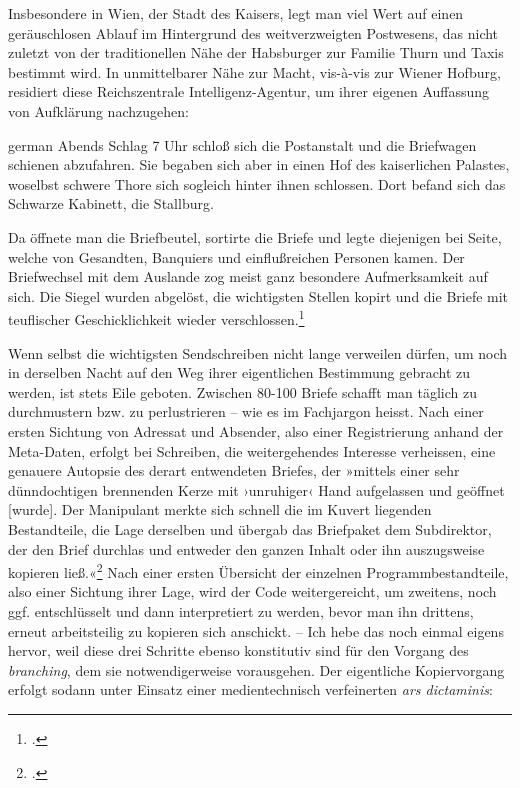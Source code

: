 \documentclass[a4paper,11pt]{article}
\newcommand{\anf}[1]{»#1«}
\newenvironment{zitat}{
\begin{foreigndisplayquote}{german}}%
{\end{foreigndisplayquote}}
\begin{document}
Insbesondere in Wien, der Stadt des Kaisers, legt man viel Wert auf einen geräuschlosen Ablauf im Hintergrund des weitverzweigten Postwesens, das nicht zuletzt von der traditionellen Nähe der Habsburger zur Familie Thurn und Taxis bestimmt wird. In unmittelbarer Nähe zur Macht, vis-à-vis zur Wiener Hofburg, residiert diese Reichszentrale Intelligenz-Agentur, um ihrer eigenen Auffassung von Aufklärung nachzugehen:
\begin{zitat}
Abends Schlag 7 Uhr schloß sich die Postanstalt und die Briefwagen schienen abzufahren. Sie begaben sich aber in einen Hof des kaiserlichen Palastes, woselbst schwere Thore sich sogleich hinter ihnen schlossen. Dort befand sich das Schwarze Kabinett, die Stallburg.

Da öffnete man die Briefbeutel, sortirte die Briefe und legte diejenigen bei Seite, welche von Gesandten, Banquiers und einflußreichen Personen kamen. Der Briefwechsel mit dem Auslande zog meist ganz besondere Aufmerksamkeit auf sich. Die Siegel wurden abgelöst, die wichtigsten Stellen kopirt und die Briefe mit teuflischer Geschicklichkeit wieder verschlossen.\footcite[40]{koenig:1875}
\end{zitat}
Wenn selbst die wichtigsten Sendschreiben nicht lange verweilen dürfen, um noch in derselben Nacht auf den Weg ihrer eigentlichen Bestimmung gebracht zu werden, ist stets Eile geboten. Zwischen 80-100 Briefe schafft man täglich zu durchmustern bzw. zu perlustrieren – wie es im Fachjargon heisst. Nach einer ersten Sichtung von Adressat und Absender, also einer Registrierung anhand der Meta-Daten, erfolgt bei Schreiben, die weitergehendes Interesse verheissen, eine genauere Autopsie des derart entwendeten Briefes, der \anf{mittels einer sehr dünndochtigen brennenden Kerze mit ›unruhiger‹ Hand aufgelassen und geöffnet [wurde]. Der Manipulant merkte sich schnell die im Kuvert liegenden Bestandteile, die Lage derselben und übergab das Briefpaket dem Subdirektor, der den Brief durchlas und entweder den ganzen Inhalt oder ihn auszugsweise kopieren ließ.}\footcite[138]{stix:1937} Nach einer ersten Übersicht der einzelnen Programmbestandteile, also einer Sichtung ihrer Lage, wird der Code weitergereicht, um zweitens, noch ggf. entschlüsselt und dann interpretiert zu werden, bevor man ihn drittens, erneut arbeitsteilig zu kopieren sich anschickt. – Ich hebe das noch einmal eigens hervor, weil diese drei Schritte ebenso konstitutiv sind für den Vorgang des \emph{branching}, dem sie notwendigerweise vorausgehen. Der eigentliche Kopiervorgang erfolgt sodann unter Einsatz einer medientechnisch verfeinerten \emph{ars dictaminis}: 
\end{document}
